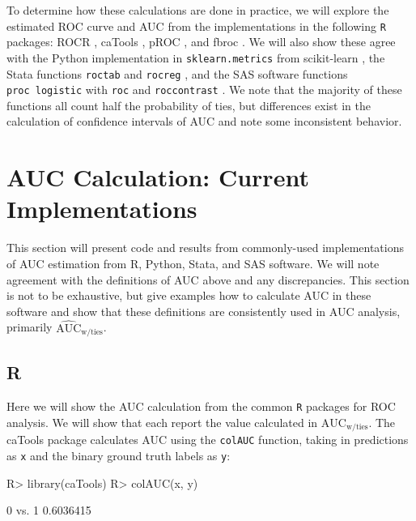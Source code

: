 \documentclass[12pt]{article}
\newcommand{\pkg}[1]{{\fontseries{b}\selectfont #1}}
\newenvironment{CodeChunk}{}{}
\begin{document}
To determine how these calculations are done in practice, we will
explore the estimated ROC curve and AUC from the implementations in the
following \texttt{R} \citep{rcore} packages: \pkg{ROCR} \citep{ROCR},
\pkg{caTools} \citep{caTools}, \pkg{pROC} \citep{pROC}, and \pkg{fbroc}
\citep{fbroc}. We will also show these agree with the Python
implementation in \texttt{sklearn.metrics} from \pkg{scikit-learn}
\citep{scikitlearn}, the Stata functions \texttt{roctab} and
\texttt{rocreg} \citep{bamber1975area, delong}, and the SAS software
functions \texttt{proc\ logistic} with \texttt{roc} and
\texttt{roccontrast} . We note that the majority of these functions all
count half the probability of ties, but differences exist in the
calculation of confidence intervals of AUC and note some inconsistent
behavior.

\hypertarget{auc-calculation-current-implementations}{%
\section{AUC Calculation: Current
Implementations}\label{auc-calculation-current-implementations}}

This section will present code and results from commonly-used
implementations of AUC estimation from R, Python, Stata, and SAS
software. We will note agreement with the definitions of AUC above and
any discrepancies. This section is not to be exhaustive, but give
examples how to calculate AUC in these software and show that these
definitions are consistently used in AUC analysis, primarily
\(\widehat{\text{AUC}}_{\text{w/ties}}\).

\hypertarget{r}{%
\subsection{R}\label{r}}

Here we will show the AUC calculation from the common \texttt{R}
packages for ROC analysis. We will show that each report the value
calculated in \(\text{AUC}_{\text{w/ties}}\). The \pkg{caTools}
\citep{caTools} package calculates AUC using the \texttt{colAUC}
function, taking in predictions as \texttt{x} and the binary ground
truth labels as \texttt{y}:

\begin{CodeChunk}

\begin{CodeInput}
R> library(caTools)
R> colAUC(x, y)
\end{CodeInput}

\begin{CodeOutput}
             [,1]
0 vs. 1 0.6036415
\end{CodeOutput}
\end{CodeChunk}
\end{document}
